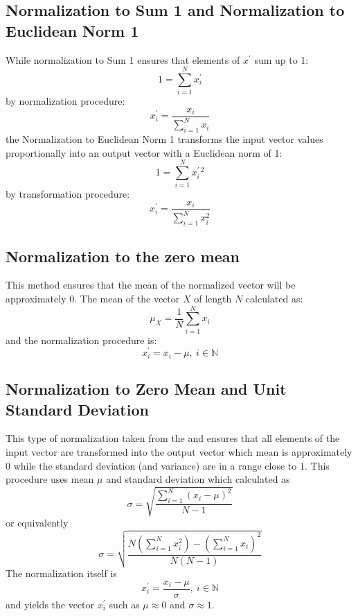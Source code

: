 \subsection{Normalization to Sum 1 and Normalization to Euclidean Norm 1}
While normalization to Sum 1 ensures that elements of $x^{'}$ sum up to 1:
\begin{equation}
1 = \sum_{i=1}^{N} x_{i}^{'}
\end{equation}
by normalization procedure:
\begin{equation}
x_{i}^{'} = \frac{ x_{i} }{ \sum_{i=1}^{N} x_{i} }
\end{equation}
the Normalization to Euclidean Norm 1 transforms the input vector values proportionally into an output vector with a Euclidean norm of 1:
\begin{equation}
1 = \sum_{i=1}^{N} x_{i}^{' \: 2}
\end{equation}
by transformation procedure:
\begin{equation}
x_{i}^{'} = \frac{ x_{i} }{ \sum_{i=1}^{N} x_{i}^2 }
\end{equation}

\subsection{Normalization to the zero mean}
This method ensures that the mean of the normalized vector will be approximately $0$. The mean of the vector $X$ of length $N$ calculated as:
\begin{equation}
\mu_{X} = \frac{1}{N}\sum_{i=1}^{N}x_{i}
\end{equation}
and the normalization procedure is:
\begin{equation}
x_{i}^{'} = x_{i} - \mu, \: i \in \mathbb{N}
\end{equation}

\subsection{Normalization to Zero Mean and Unit Standard Deviation} \label{sect:normalization}
This type of normalization taken from the \cite{citeulike:3815880} and ensures that all elements of the input vector are transformed into the output vector which mean is approximately $0$ while the standard deviation (and variance) are in a range close to $1$.
This procedure uses mean $\mu$ and standard deviation which calculated as 
\begin{equation}
\sigma = \sqrt{ \frac{ \sum_{i=1}^{N} (x_{i} - \mu)^{2} }{ N - 1 } }
\end{equation}
or equivalently
\begin{equation}
\sigma = \sqrt{ \frac{
                  N \left( \sum_{i=1}^{N} x_{i}^{2}  \right) - 
                  \left( \sum_{i=1}^{N} x_{i} \right) ^{2}
                }{
                  N(N-1)
                }  
          }
\end{equation}
The normalization itself is 
\begin{equation}
x_{i}^{'} = \frac{x_{i} - \mu}{\sigma}, \: i \in \mathbb{N}
\end{equation}
and yields the vector $x_{i}^{'}$ such as $\mu \approx 0$ and $\sigma \approx 1$.

